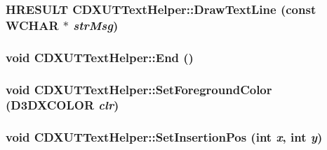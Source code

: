 \label{class_c_d_x_u_t_text_helper_ab0bfaac9948007694f0dbecfe8dc6aba}
\hypertarget{class_c_d_x_u_t_text_helper_a57d1d7b2fc521fd837f17647b4e2bec2}{
\subsubsection[{DrawTextLine}]{\setlength{\rightskip}{0pt plus 5cm}HRESULT CDXUTTextHelper::DrawTextLine (const WCHAR $\ast$ {\em strMsg})}}
\label{class_c_d_x_u_t_text_helper_a57d1d7b2fc521fd837f17647b4e2bec2}
\hypertarget{class_c_d_x_u_t_text_helper_a505f277a35d77a60d475e10d18863852}{
\subsubsection[{End}]{\setlength{\rightskip}{0pt plus 5cm}void CDXUTTextHelper::End ()}}
\label{class_c_d_x_u_t_text_helper_a505f277a35d77a60d475e10d18863852}
\hypertarget{class_c_d_x_u_t_text_helper_a9ae933e832dddf394737b7e6c5b970d2}{
\subsubsection[{SetForegroundColor}]{\setlength{\rightskip}{0pt plus 5cm}void CDXUTTextHelper::SetForegroundColor (D3DXCOLOR {\em clr})}}
\label{class_c_d_x_u_t_text_helper_a9ae933e832dddf394737b7e6c5b970d2}
\hypertarget{class_c_d_x_u_t_text_helper_afa59908c522b99f026652c12344d0a45}{
\subsubsection[{SetInsertionPos}]{\setlength{\rightskip}{0pt plus 5cm}void CDXUTTextHelper::SetInsertionPos ({\bf int} {\em x}, \/  {\bf int} {\em y})}}
\label{class_c_d_x_u_t_text_helper_afa59908c522b99f026652c12344d0a45}


